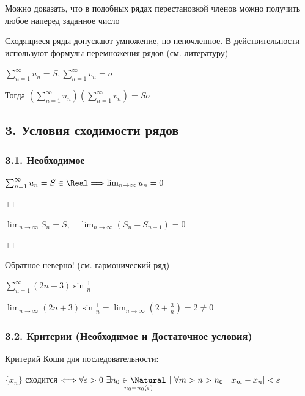 \documentclass[12pt]{article}
\begin{document}
    \Notas Можно доказать, что в подобных рядах перестановкой членов можно получить любое наперед заданное число

    \Notas Сходящиеся ряды допускают умножение, но непочленное. В действительности используют формулы перемножения рядов (см. литературу)

    $\sum_{n = 1}^\infty u_n = S, \sum_{n = 1}^\infty v_n = \sigma$

    Тогда $\left(\sum_{n = 1}^\infty u_n\right)\left(\sum_{n = 1}^\infty v_n\right) = S\sigma$

    \mediumvspace

    \subsection{3. Условия сходимости рядов}

    \hypertarget{necessarycondition}{}

    \subsubsection{3.1. Необходимое}

    \begin{MyTheorem}
        \Ths $\sum_{n = 1}^\infty u_n = S \in \Real \Longrightarrow \lim_{n \to \infty} u_n = 0$
    \end{MyTheorem}

    \begin{tcolorbox}
        $\Box$

        $\lim_{n \to \infty} S_n = S, \quad \lim_{n\to\infty} (S_n - S_{n - 1}) = 0$

        $\Box$
    \end{tcolorbox}

    \Nota Обратное неверно! (см. гармонический ряд)

    \Ex $\sum_{n = 1}^\infty (2n + 3) \sin \frac{1}{n}$

    $\lim_{n \to \infty} (2n + 3) \sin \frac{1}{n} = \lim_{n \to \infty} (2 + \frac{3}{n}) = 2 \neq 0$

    \subsubsection{3.2. Критерии (Необходимое и Достаточное условия)}

    \hypertarget{cauchycriteria}{}

    \Mem Критерий Коши для последовательности: 
    
    $\{x_n\}$ сходится $\Longleftrightarrow \forall \varepsilon > 0 \ \exists \underset{n_0 = n_0 (\varepsilon)}{n_0 \in \Natural} \ | \ \forall m > n > n_0 \ \ |x_m - x_n| < \varepsilon$
\end{document}
